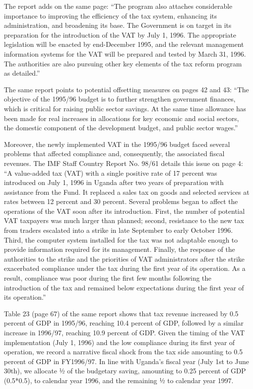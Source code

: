 The report adds on the same page: “The program also attaches considerable importance to improving the efficiency of the tax system, enhancing its administration, and broadening its base. The Government is on target in its preparation for the introduction of the VAT by July 1, 1996. The appropriate legislation will be enacted by end-December 1995, and the relevant management information systems for the VAT will be prepared and tested by March 31, 1996. The authorities are also pursuing other key elements of the tax reform program as detailed.”

The same report points to potential offsetting measures on pages 42 and 43: “The objective of the 1995/96 budget is to further strengthen government finances, which is critical for raising public sector savings. At the same time allowance has been made for real increases in allocations for key economic and social sectors, the domestic component of the development budget, and public sector wages.”

Moreover, the newly implemented VAT in the 1995/96 budget faced several problems that affected compliance and, consequently, the associated fiscal revenues. The IMF Staff Country Report No. 98/61 details this issue on page 4: “A value-added tax (VAT) with a single positive rate of 17 percent was introduced on July 1, 1996 in Uganda     after two years of preparation with assistance from the Fund. It replaced a sales tax on goods and selected services at rates between 12 percent and 30 percent. Several problems began to affect the operations of the VAT soon after its introduction. First, the number of potential VAT taxpayers was much larger than planned; second, resistance to the new tax from traders escalated into a strike in late September to early October 1996. Third, the computer system installed for the tax was not adaptable enough to provide information required for its management. Finally, the response of the authorities to the strike and the priorities of VAT administrators after the strike exacerbated compliance under the tax during the first year of its operation. As a result, compliance was poor during the first few months following the introduction of the tax and remained below expectations during the first year of its operation.”

Table 23 (page 67) of the same report shows that tax revenue increased by 0.5 percent of GDP in 1995/96, reaching 10.4 percent of GDP, followed by a similar increase in 1996/97, reaching 10.9 percent of GDP. Given the timing of the VAT implementation (July 1, 1996) and the low compliance during its first year of operation, we record a narrative fiscal shock from the tax side amounting to 0.5 percent of GDP in FY1996/97. In line with Uganda’s fiscal year (July 1st to June 30th), we allocate ½ of the budgetary saving, amounting to 0.25 percent of GDP (0.5*0.5), to calendar year 1996, and the remaining ½ to calendar year 1997. 

